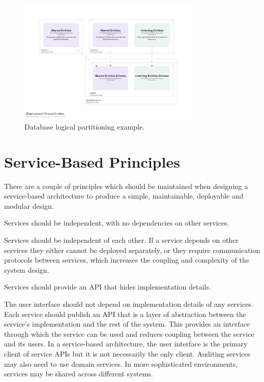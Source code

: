 \begin{figure}[h!]
    \centering
    \includegraphics[trim=197 197 197 197,clip,width=0.78\textwidth]{diagrams/db-logical-partitioning.png}
    \caption{Database logical partitioning example.}
    \label{fig:db-logical-partitioning}
\end{figure}

\section{Service-Based Principles}
There are a couple of principles which should be maintained when designing a service-based architecture
to produce a simple, maintainable, deployable and modular design.

\vspace{1mm}
\begin{definition}\label{independent-service}
    Services should be independent, with no dependencies on other services.
\end{definition}

Services should be independent of each other.
If a service depends on other services they either cannot be deployed separately,
or they require communication protocols between services, which increases the coupling and complexity of the system design.

\vspace{1mm}
\begin{definition}\label{api-abstraction}
    Services should provide an API that hides implementation details.
\end{definition}

The user interface should not depend on implementation details of any services.
Each service should publish an API that is a layer of abstraction between the service's implementation and the rest of the system.
This provides an interface through which the service can be used and reduces coupling between the service and its users.
In a service-based architecture, the user interface is the primary client of service APIs but it is not necessarily the only client.
Auditing services may also need to use domain services.
In more sophisticated environments, services may be shared across different systems.


